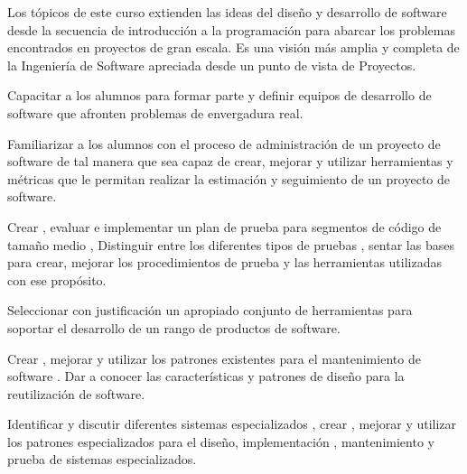 \begin{syllabus}


\begin{justification}
	Los tópicos de este curso extienden las ideas del diseño y desarrollo de software desde la secuencia de introducción
	a la programación para abarcar los problemas encontrados en proyectos de gran escala. Es una visión más amplia y
	completa de la Ingeniería de Software apreciada desde un punto de vista de Proyectos.
	\end{justification}
	
	\begin{goals}
		\item Capacitar a los alumnos para formar parte y definir equipos de desarrollo de software que afronten problemas de envergadura real.
		\item Familiarizar a los alumnos con el proceso de administración de un proyecto de software de tal manera que sea capaz de crear, mejorar y utilizar herramientas y métricas que le permitan realizar la estimación y seguimiento de un proyecto de software.
		\item Crear , evaluar e implementar un plan de prueba para segmentos de código de tamaño medio , Distinguir entre los diferentes tipos de pruebas , sentar las bases para crear, mejorar los procedimientos de prueba y las herramientas utilizadas con ese propósito.
		\item Seleccionar con justificación un apropiado conjunto de herramientas para soportar el desarrollo de un rango de productos de software.
		\item Crear , mejorar y utilizar los patrones existentes para el mantenimiento de software . Dar a conocer las características y patrones de diseño para la reutilización de software.
		\item Identificar y discutir diferentes sistemas especializados , crear , mejorar y utilizar los patrones especializados para el diseño, implementación , mantenimiento y prueba de sistemas especializados.
	\end{goals}
	


\end{syllabus}
